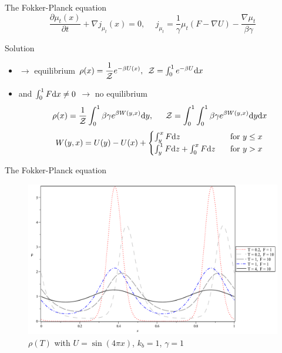 \begin{frame}{The Fokker-Planck equation}
	\vspace{-5pt}
	\begin{equation*}
		\frac{\partial \mu_t (x)}{\partial t} + \nabla j_{\mu_t}(x) = 0, \hspace{15pt}  j_{\mu_t} = \frac{1}{\gamma}\mu_t \left( F - \nabla U \right) - \frac{\nabla\mu_t}{\beta\gamma}
	\end{equation*}
	\vspace{-10pt}
	\begin{block}{Solution}
		\begin{itemize}
			\item  {}  $ \rightarrow $  equilibrium \hspace{12pt} $\rho(x)=\dfrac{1}{\mathcal{Z}} e^{-\beta U(x)}, \hspace{5pt} \mathcal{Z} = \int_{0}^{1} e^{-\beta U} \text{d} x $
			\item  {}  and $ \int_{0}^{1}F \text{d} x \neq 0 $ $ \rightarrow $ no equilibrium
			\begin{equation*}
				\rho (x)= \frac{1}{\mathcal{Z}}\int_{0}^{1} \beta\gamma e^{\beta W(y,x)} \text{d} y, \hspace{15pt}
				\mathcal{Z} = \int_{0}^{1} \int_{0}^{1} \beta\gamma e^{\beta W(y,x)} \text{d} y \text{d} x
			\end{equation*}
			\begin{equation*}
				W(y,x) = U(y) - U(x) +
				\begin{cases}
					\int_{y}^{x}F \text{d} z  \hspace{5pt} &\text{ for } y\leq x\\
					\int_{y}^{1}F \text{d} z + \int_{0}^{x}F\text{d} z \hspace{5pt} &\text{ for } y>x
				\end{cases}
			\end{equation*}
		\end{itemize}
	\end{block}
\end{frame}

\begin{frame}{The Fokker-Planck equation}
	\begin{figure}
		\centering
		\includegraphics[width=.8\textwidth]{../src/plot/langevin/RhoInFunctionOfX_Langevin-eps-converted-to.pdf}
		\caption{$\rho(T)$ with $U= \sin(4\pi x)$, $k_b=1$, $\gamma=1$}
	\end{figure}	
\end{frame}